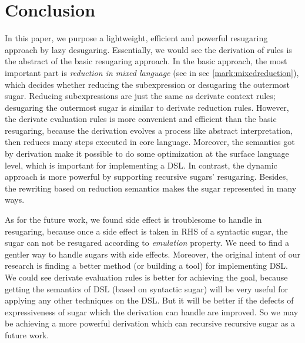 \section{Conclusion}
\label{sec7}


In this paper, we purpose a lightweight, efficient and powerful resugaring approach by lazy desugaring. Essentially, we would see the derivation of rules is the abstract of the basic resugaring approach. In the basic approach, the most important part is \emph{reduction in mixed language} (see in sec \ref{mark:mixedreduction}), which decides whether reducing the subexpression or desugaring the outermost sugar. Reducing subexpressions are just the same as derivate context rules; desugaring the outermost sugar is similar to derivate reduction rules. However, the derivate evaluation rules is more convenient and efficient than the basic resugaring, because the derivation evolves a process like abstract interpretation\cite{AbstractInterpretation}, then reduces many steps executed in core language. Moreover, the semantics got by derivation make it possible to do some optimization at the surface language level, which is important for implementing a DSL. In contrast, the dynamic approach is more powerful by supporting recursive sugars' resugaring. Besides, the rewriting based on reduction semantics makes the sugar represented in many ways.

As for the future work, we found side effect is troublesome to handle in resugaring, because once a side effect is taken in RHS of a syntactic sugar, the sugar can not be resugared according to \emph{emulation} property. We need to find a gentler way to handle sugars with side effects. Moreover,
the original intent of our research is finding a better method (or building a tool) for implementing DSL. We could see derivate evaluation rules is better for achieving the goal, because getting the semantics of DSL (based on syntactic sugar) will be very useful for applying any other techniques on the DSL. But it will be better if the defects of expressiveness of sugar which the derivation can handle are improved. So we may be achieving a more powerful derivation which can recursive recursive sugar as a future work.

